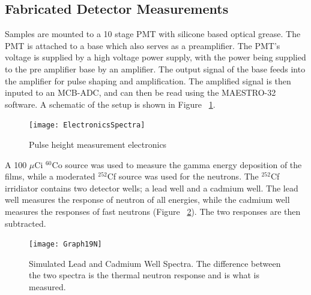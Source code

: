 \documentclass{anstrans}
\newcommand{\iso}[2]{${}^{#2}${#1}}
\begin{document}
\subsection{Fabricated Detector Measurements}
Samples are mounted to a 10 stage PMT with silicone based optical grease.
The PMT is attached to a base which also serves as a preamplifier.   
The PMT's voltage is supplied by a high voltage power supply, with the power being supplied to the pre amplifier base by an amplifier.  
The output signal of the base feeds into the amplifier for pulse shaping and amplification. 
The amplified signal is then inputed to an MCB-ADC, and can then be read using the MAESTRO-32 software. 
A schematic of the setup is shown in Figure ~\ref{fig:ElectronicsSpectra}.
\begin{figure}[h]
	\centering
	\texttt{[image: ElectronicsSpectra]}
	\caption{Pulse height measurement electronics}
	\label{fig:ElectronicsSpectra}
\end{figure}
A 100 $\mu$Ci \iso{Co}{60} source was used to measure the gamma energy deposition of the films, while a moderated \iso{Cf}{252} source was used for the neutrons.
The \iso{Cf}{252} irridiator contains two detector wells; a lead well and a cadmium well.
The lead well measures the response of neutron of all energies, while the cadmium well measures the responses of fast neutrons (Figure ~\ref{fig:SimPbCdSpectra}).
The two responses are then subtracted.
\begin{figure}
	\centering
	\texttt{[image: Graph19N]}
	\caption{Simulated Lead and Cadmium Well Spectra. The difference between the two spectra is the thermal neutron response and is what is measured.}
	\label{fig:SimPbCdSpectra}
\end{figure}
\end{document}
